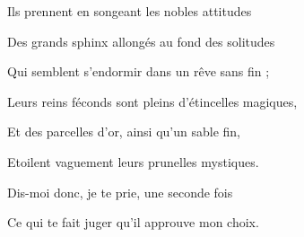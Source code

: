 \documentclass[12pt,twoside,openany]{book}
\newenvironment{lateiDocument}{}{}
\begin{document}
\begin{lateiDocument}
\begin{teiElement}[name={TEI}]
\begin{teiElement}[name={text},xmlid={text-001}]
\begin{teiElement}[name={body},xmlid={body-001}]
\begin{teiDiv}[type={section1},xmlid={section1-007}]
\begin{teiDiv}[type={section2},xmlid={section2-008}]
\begin{teiElement}[name={lg}]
\end{teiElement}
				
\end{teiDiv}
				\begin{teiDiv}[type={section2},xmlid={section2-009}]

					\begin{teiElement}[name={lg}]

						\begin{teiElement}[name={l},n={1}]
 Ils prennent en songeant les nobles attitudes
\end{teiElement}
						\begin{teiElement}[name={l}]
Des grands sphinx allongés au fond des solitudes
\end{teiElement}
						\begin{teiElement}[name={l}]
Qui semblent s'endormir dans un rêve sans fin ;
\end{teiElement}
					
\end{teiElement}
					\begin{teiElement}[name={lg}]

						\begin{teiElement}[name={l},n={4}]
 Leurs reins féconds sont pleins d'étincelles magiques,
\end{teiElement}
						\begin{teiElement}[name={l}]
Et des parcelles d'or, ainsi qu'un sable fin,
\end{teiElement}
						\begin{teiElement}[name={l}]
Etoilent vaguement leurs prunelles mystiques.
\end{teiElement}
					
\end{teiElement}
				
\end{teiDiv}
				\begin{teiDiv}[type={section2},xmlid={section2-010}]

					\begin{teiElement}[name={sp}]

						\begin{teiElement}[name={l}]
Dis-moi donc, je te prie, une seconde fois 
\end{teiElement}
						\begin{teiElement}[name={l}]
Ce qui te fait juger qu'il approuve mon choix. 
\end{teiElement}
					

\end{teiElement}
\end{teiDiv}
\end{teiDiv}
\end{teiElement}
\end{teiElement}
\end{teiElement}
\end{lateiDocument}
\end{document}
